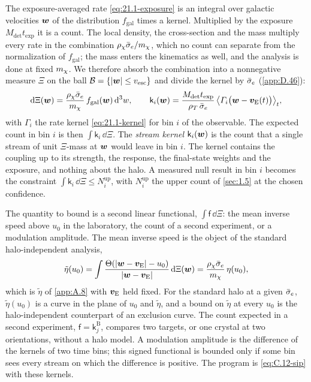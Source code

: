 The exposure-averaged rate \cref{eq:21.1-exposure} is an integral over galactic velocities $\bm{w}$ of the distribution $f_{\mathrm{gal}}$ times a kernel. Multiplied by the exposure $M_{\mathrm{det}}t_{\mathrm{exp}}$ it is a count. The local density, the cross-section and the mass multiply every rate in the combination $\rho_\chi\bar{\sigma}_{e}/m_{\chi}$, which no count can separate from the normalization of $f_{\mathrm{gal}}$; the mass enters the kinematics as well, and the analysis is done at fixed $m_{\chi}$. We therefore absorb the combination into a nonnegative measure $\Xi$ on the ball $\mathcal{B} = \{|\bm{w}| \le v_{\mathrm{esc}}\}$ and divide the kernel by $\bar{\sigma}_{e}$ (\cref{app:D.46}):
\begin{equation}
  \mathrm{d}\Xi(\bm{w}) = \frac{\rho_\chi\bar{\sigma}_{e}}{m_{\chi}}\,f_{\mathrm{gal}}(\bm{w})\,\mathrm{d}^3w , \qquad
  \mathsf{k}_i(\bm{w}) = \frac{M_{\mathrm{det}}t_{\mathrm{exp}}}{\rho_T\,\bar{\sigma}_{e}}\,\bigl\langle\varGamma_i\bigl(\bm{w} - \bm{v}_{\mathrm{E}}(t)\bigr)\bigr\rangle_t ,
  \label{eq:21.2-stream}
\end{equation}
with $\varGamma_i$ the rate kernel \cref{eq:21.1-kernel} for bin $i$ of the observable. The expected count in bin $i$ is then $\int\mathsf{k}_i\,\dd\Xi$. The \emph{stream kernel} $\mathsf{k}_i(\bm{w})$ is the count that a single stream of unit $\Xi$-mass at $\bm{w}$ would leave in bin $i$. The kernel contains the coupling up to its strength, the response, the final-state weights and the exposure, and nothing about the halo. A measured null result in bin $i$ becomes the constraint $\int\mathsf{k}_i\,\dd\Xi \le N_i^{\mathrm{up}}$, with $N_i^{\mathrm{up}}$ the upper count of \cref{sec:1.5} at the chosen confidence.

The quantity to bound is a second linear functional, $\int\mathsf{f}\,\dd\Xi$: the mean inverse speed above $u_0$ in the laboratory, the count of a second experiment, or a modulation amplitude. The mean inverse speed is the object of the standard halo-independent analysis,
\begin{equation}
  \tilde\eta(u_0) = \int\frac{\Theta(|\bm{w} - \bm{v}_{\mathrm{E}}| - u_0)}{|\bm{w} - \bm{v}_{\mathrm{E}}|}\,\mathrm{d}\Xi(\bm{w}) = \frac{\rho_\chi\bar{\sigma}_{e}}{m_{\chi}}\,\eta(u_0) ,
  \label{eq:21.2-etatilde}
\end{equation}
which is $\tilde\eta$ of \cref{app:A.8} with $\bm{v}_{\mathrm{E}}$ held fixed. For the standard halo at a given $\bar{\sigma}_{e}$, $\tilde\eta(u_0)$ is a curve in the plane of $u_0$ and $\tilde\eta$, and a bound on $\tilde\eta$ at every $u_0$ is the halo-independent counterpart of an exclusion curve. The count expected in a second experiment, $\mathsf{f} = \mathsf{k}^{\mathrm{B}}_j$, compares two targets, or one crystal at two orientations, without a halo model. A modulation amplitude is the difference of the kernels of two time bins; this signed functional is bounded only if some bin sees every stream on which the difference is positive. The program is \cref{eq:C.12-sip} with these kernels.

